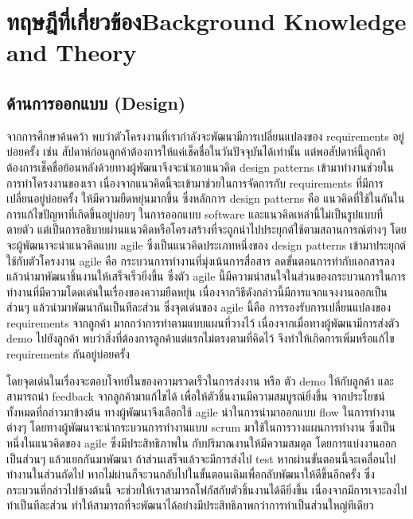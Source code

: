 \chapter{\ifcpe ทฤษฎีที่เกี่ยวข้อง\else Background Knowledge and Theory\fi}


\section{ด้านการออกแบบ (Design)}
จากการศึกษาค้นคว้า พบว่าตัวโครงงานที่เรากำลังจะพัฒนามีการเปลี่ยนแปลงของ requirements อยู่บ่อยครั้ง เช่น สัปดาห์ก่อนลูกค้าต้องการให้แค่เช็คชื่อในวันปัจจุบันได้เท่านั้น  แต่พอสัปดาห์นี้ลูกค้าต้องการเช็คชื่อย้อนหลังด้วยทางผู้พัฒนาจึงจะนำเอาแนวคิด design patterns \cite{designPatterns} เข้ามาทำงานช่วยในการทำโครงงานของเรา เนื่องจากแนวคิดนี้จะเข้ามาช่วยในการจัดการกับ requirements ที่มีการเปลี่ยนอยู่บ่อยครั้ง ให้มีความยืดหยุ่นมากขึ้น
ซึ่งหลักการ design patterns คือ แนวคิดที่ใช้ในกันในการแก้ไขปัญหาที่เกิดขึ้นอยู่บ่อยๆ ในการออกแบบ software และแนวคิดเหล่านี้ไม่เป็นรูปแบบที่ตายตัว แต่เป็นการอธิบายผ่านแนวคิดหรือโครงสร้างที่จะถูกนำไปประยุกต์ใช้ตามสถานการณ์ต่างๆ  
โดยจะผู้พัฒนาจะนำแนวคิดแบบ agile \cite{agile}  ซึ่งเป็นแนวคิดประเภทหนึ่งของ design patterns เข้ามาประยุกต์ใช้กับตัวโครงงาน agile คือ กระบวนการทำงานที่มุ่งเน้นการสื่อสาร ลดขั้นตอนการทำกับเอกสารลง แล้วนำมาพัฒนาชิ้นงานให้เสร็จเร็วยิ่งขึ้น  ซึ่งตัว agile นี้มีความน่าสนใจในส่วนของกระบวนการในการทำงานที่มีความโดดเด่นในเรื่องของความยืดหยุ่น  เนื่องจากวิธีดังกล่าวนี้มีการแจกแจงงานออกเป็นส่วนๆ  แล้วนำมาพัฒนากันเป็นทีละส่วน  
ซึ่งจุดเด่นของ agile นี้คือ การรองรับการเปลี่ยนแปลงของ requirements จากลูกค้า มากกว่าการทำตามแบบแผนที่วางไว้  เนื่องจากเมื่อทางผู้พัฒนามีการส่งตัว demo ไปยังลูกค้า  พบว่าสิ่งที่ต้องการลูกค้าแต่แรกไม่ตรงตามที่คิดไว้  จึงทำให้เกิดการเพิ่มหรือแก้ไข requirements กันอยู่บ่อยครั้ง

โดยจุดเด่นในเรื่องจะตอบโจทย์ในของความรวดเร็วในการส่งงาน หรือ ตัว demo ให้กับลูกค้า และสามารถนำ feedback จากลูกค้ามาแก้ไขได้ เพื่อให้ตัวชิ้นงานมีความสมบูรณ์ยิ่งขึ้น 
 จากประโยชน์ทั้งหมดที่กล่าวมาข้างต้น ทางผู้พัฒนาจึงเลือกใช้ agile นำในการนำมาออกแบบ flow ในการทำงานต่างๆ  โดยทางผู้พัฒนาจะนำกระบวนการทำงานแบบ scrum \cite{srcum} มาใช้ในการวางแผนการทำงาน 
ซึ่งเป็นหนึ่งในแนวคิดของ agile ซึ่งมีประสิทธิภาพใน กับปริมาณงานให้มีความสมดุล  โดยการแบ่งงานออกเป็นส่วนๆ แล้วแยกกันมาพัฒนา  ถ้าส่วนเสร็จแล้วจะมีการส่งไป test  หากผ่านขั้นตอนนี้จะเคลื่อนไปทำงานในส่วนถัดไป  หากไม่ผ่านก็จะวนกลับไปในขั้นตอนเดิมเพื่อกลับพัฒนาให้ดีขึ้นอีกครั้ง ซึ่งกระบวนที่กล่าวไปข้างต้นนี้  จะช่วยให้เราสามารถโฟกัสกับตัวชิ้นงานได้ดียิ่งขึ้น เนื่องจากมีการเจาะลงไป ทำเป็นทีละส่วน ทำให้สามารถที่จะพัฒนาได้อย่างมีประสิทธิภาพกว่าการทำเป็นส่วนใหญ่ทีเดียว

